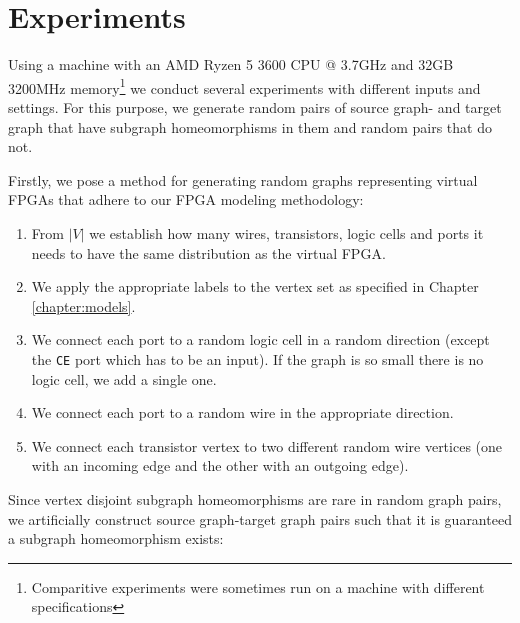 \chapter{Experiments}
\label{chapter:experiments}
Using a machine with an AMD Ryzen 5 3600 CPU @ 3.7GHz and 32GB 3200MHz memory\footnote{Comparitive experiments were sometimes run on a machine with different specifications} we conduct several experiments with different inputs and settings. For this purpose, we generate random pairs of source graph- and target graph that have subgraph homeomorphisms in them and random pairs that do not.

Firstly, we pose a method for generating random graphs representing virtual FPGAs that adhere to our FPGA modeling methodology:

\begin{enumerate}
\item From $|V|$ we establish how many wires, transistors, logic cells and ports it needs to have the same distribution as the virtual FPGA.
\item We apply the appropriate labels to the vertex set as specified in Chapter \ref{chapter:models}.
\item We connect each port to a random logic cell in a random direction (except the \texttt{CE} port which has to be an input). If the graph is so small there is no logic cell, we add a single one.
\item We connect each port to a random wire in the appropriate direction.
\item We connect each transistor vertex to two different random wire vertices (one with an incoming edge and the other with an outgoing edge).
\end{enumerate}

Since vertex disjoint subgraph homeomorphisms are rare in random graph pairs, we artificially construct source graph-target graph pairs such that it is guaranteed a subgraph homeomorphism exists:


